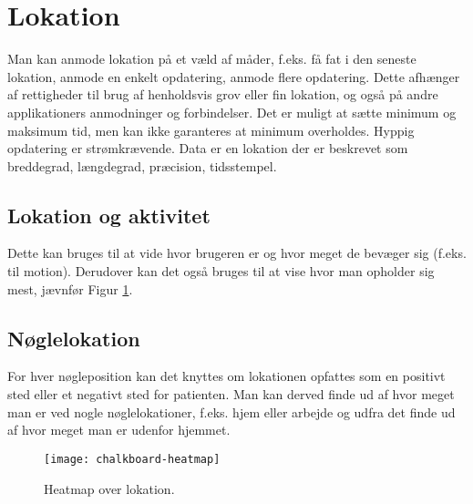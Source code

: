 \section{Lokation}
Man kan anmode lokation på et væld af måder, f.eks. få fat i den seneste lokation, anmode en enkelt opdatering, anmode flere opdatering. 
Dette afhænger af rettigheder til brug af henholdsvis grov eller fin lokation, og også på andre applikationers anmodninger og forbindelser. Det er muligt at sætte minimum og maksimum tid, men kan ikke garanteres at minimum overholdes. Hyppig opdatering er strømkrævende. 
Data er en lokation der er beskrevet som breddegrad, længdegrad, præcision, tidsstempel.

\subsection{Lokation og aktivitet}
Dette kan bruges til at vide hvor brugeren er og hvor meget de bevæger sig (f.eks. til motion).
Derudover kan det også bruges til at vise hvor man opholder sig mest, jævnfør Figur \ref{heatmap}.
\subsection{Nøglelokation}
For hver nøgleposition kan det knyttes om lokationen opfattes som en positivt sted eller et negativt sted for patienten.
Man kan derved finde ud af hvor meget man er ved nogle nøglelokationer, f.eks. hjem eller arbejde og udfra det finde ud af hvor meget man er udenfor hjemmet. 

\begin{figure}[H]
	\centering
	\texttt{[image: chalkboard-heatmap]}
	\caption{Heatmap over lokation.}\label{heatmap}
\end{figure}
